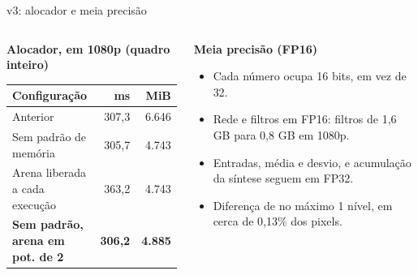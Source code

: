 \documentclass[
    aspectratio=169,
    12pt,
    brazil,
    xcolor=table
]{beamer}
\newcommand{\nota}[1]{\par\vspace{3pt}{\scriptsize #1\par}}
\begin{document}
\begin{frame}{v3: alocador e meia precisão}
  \begin{columns}[T]
    \begin{column}{0.56\textwidth}
      \footnotesize
      \textbf{Alocador, em 1080p (quadro inteiro)}\\[3pt]
      \setlength{\tabcolsep}{4pt}
      \begin{tabular}{lrr}
        \toprule
        \textbf{Configuração} & \textbf{ms} & \textbf{MiB} \\
        \midrule
        Anterior & 307,3 & 6.646 \\
        Sem padrão de memória & 305,7 & 4.743 \\
        Arena liberada a cada execução & 363,2 & 4.743 \\
        \rowcolor{senacblue!15}
        \textbf{Sem padrão, arena em pot. de 2} & \textbf{306,2} & \textbf{4.885} \\
        \bottomrule
      \end{tabular}
      \nota{ms e MiB: menor é melhor; GPU de 8.188 MiB. Desativar o padrão de memória: $-29\%$ de pico, sem custo de tempo. A combinação em destaque foi a adotada porque tem a menor memória sem custo de tempo nos blocos.}
    \end{column}
    \begin{column}{0.42\textwidth}
      \footnotesize
      \textbf{Meia precisão (FP16)}
      \begin{itemize}
        \item Cada número ocupa 16 bits, em vez de 32.
        \item Rede e filtros em FP16: filtros de 1,6 GB para 0,8 GB em 1080p.
        \item Entradas, média e desvio, e acumulação da síntese seguem em FP32.
        \item Diferença de no máximo 1 nível, em cerca de 0,13\% dos pixels.
      \end{itemize}
    \end{column}
  \end{columns}
\end{frame}

\end{document}
